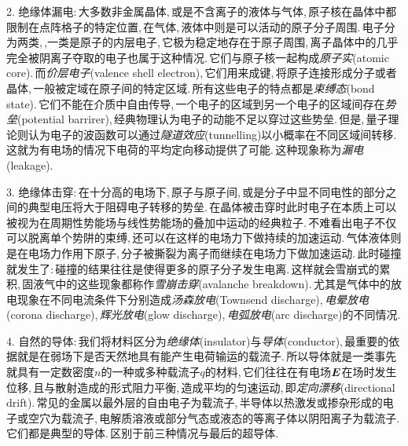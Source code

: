 	\vspace{0.3cm}2. 绝缘体漏电:\,大多数非金属晶体,\,或是不含离子的液体与气体,\,原子核在晶体中都限制在点阵格子的特定位置,\,在气体,\,液体中则是可以活动的原子分子周围.\,电子分为两类,\,,一类是原子的内层电子,\,它极为稳定地存在于原子周围,\,离子晶体中的几乎完全被阴离子夺取的电子也属于这种情况.\,它们与原子核一起构成\emph{原子实}(atomic core).\,而\emph{价层电子}(valence shell electron),\,它们用来成键,\,将原子连接形成分子或者晶体,\,一般被定域在原子间的特定区域.\,所有这些电子的特点都是\emph{束缚态}(bond state).\,它们不能在介质中自由传导,\,一个电子的区域到另一个电子的区域间存在\emph{势垒}(potential barrirer),\,经典物理认为电子的动能不足以穿过这些势垒.\,但是,\,量子理论则认为电子的波函数可以通过\emph{隧道效应}(tunnelling)以小概率在不同区域间转移.\,这就为有电场的情况下电荷的平均定向移动提供了可能.\,这种现象称为\emph{漏电}(leakage).

	\vspace{0.3cm} 3. 绝缘体击穿:\,在十分高的电场下,\,原子与原子间,\,或是分子中显不同电性的部分之间的典型电压将大于阻碍电子转移的势垒.\,在晶体被击穿时此时电子在本质上可以被视为在周期性势能场与线性势能场的叠加中运动的经典粒子.\,不难看出电子不仅可以脱离单个势阱的束缚,\,还可以在这样的电场力下做持续的加速运动.\,气体液体则是在电场力作用下原子,\,分子被撕裂为离子而继续在电场力下做加速运动.\,此时碰撞就发生了:\,碰撞的结果往往是使得更多的原子分子发生电离.\,这样就会雪崩式的累积,\,固液气中的这些现象都称作\emph{雪崩击穿}(avalanche breakdown).\,尤其是气体中的放电现象在不同电流条件下分别造成\emph{汤森放电}(Townsend discharge),\,\emph{电晕放电}(corona discharge),\,\emph{辉光放电}(glow discharge),\,\emph{电弧放电}(arc discharge)的不同情况.

	\vspace{0.3cm} 4. 自然的导体:\,我们将材料区分为\emph{绝缘体}(insulator)与\emph{导体}(conductor),\,最重要的依据就是在弱场下是否天然地具有能产生电荷输运的载流子.\,所以导体就是一类事先就具有一定数密度$n$的一种或多种载流子$q$的材料,\,它们往往在有电场$\boldsymbol{E}$在场时发生位移,\,且与散射造成的形式阻力平衡,\,造成平均的匀速运动,\,即\emph{定向漂移}(directional drift).\,常见的金属以最外层的自由电子为载流子,\,半导体以热激发或掺杂形成的电子或空穴为载流子,\,电解质溶液或部分气态或液态的等离子体以阴阳离子为载流子.\,它们都是典型的导体.\,区别于前三种情况与最后的超导体.

